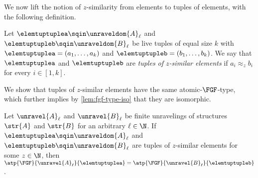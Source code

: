 \noindent
We now lift the notion of $z$-similarity from elements to tuples of elements, with the following definition.
\begin{definition}
Let $\elemtuptuplea \sqin \unraveldom{A}_{\ell}$ and $\elemtuptupleb \sqin \unraveldom{B}_{\ell}$ be live tuples of equal size $k$ with $\elemtuptuplea = (a_{1}, \ldots, a_{k})$ and $\elemtuptupleb = (b_{1}, \ldots, b_{k})$.
We say that $\elemtuptuplea$ and $\elemtuptupleb$ are \emph{tuples of $z$-similar elements} if $a_{i} \approx_{z} b_{i}$ for every $i \in [1,k]$.
\end{definition}
We show that tuples of $z$-similar elements have the same atomic-$\FGF$-type, which further implies by \cref{lem:fgf-type-iso} that they are isomorphic.
\begin{lemma}\label{lem:tuple-sim-eq-atp}
  Let $\unravel{A}_{\ell}$ and $\unravel{B}_{\ell}$ be finite unravelings of structures $\str{A}$ and $\str{B}$ for an arbitrary $\ell \in \N$.
  If $\elemtuptuplea \sqin \unraveldom{A}_{\ell}$ and $\elemtuptupleb \sqin \unraveldom{B}_{\ell}$ are tuples of $z$-similar elements for some $z \in \N$, then $\atp{\FGF}{\unravel{A}_{\ell}}{\elemtuptuplea} = \atp{\FGF}{\unravel{B}_{\ell}}{\elemtuptupleb}$.
\end{lemma}
